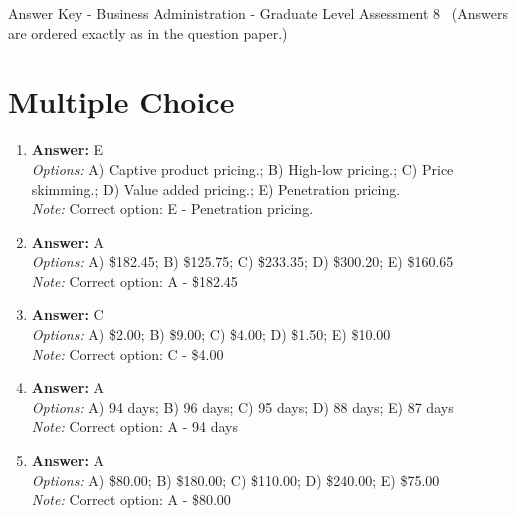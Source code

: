 \documentclass[12pt]{article}
\begin{document}
\begin{center}
Answer Key - Business Administration - Graduate Level Assessment 8 \
\small (Answers are ordered exactly as in the question paper.)
\end{center}

\section*{Multiple Choice}
\begin{enumerate}[label=\arabic*.]
\item \textbf{Answer:} E
\\ \textit{Options:} A) Captive product pricing.; B) High-low pricing.; C) Price skimming.; D) Value added pricing.; E) Penetration pricing.
\\ \textit{Note:} Correct option: E - Penetration pricing.
\item \textbf{Answer:} A
\\ \textit{Options:} A) \$182.45; B) \$125.75; C) \$233.35; D) \$300.20; E) \$160.65
\\ \textit{Note:} Correct option: A - \$182.45
\item \textbf{Answer:} C
\\ \textit{Options:} A) \$2.00; B) \$9.00; C) \$4.00; D) \$1.50; E) \$10.00
\\ \textit{Note:} Correct option: C - \$4.00
\item \textbf{Answer:} A
\\ \textit{Options:} A) 94 days; B) 96 days; C) 95 days; D) 88 days; E) 87 days
\\ \textit{Note:} Correct option: A - 94 days
\item \textbf{Answer:} A
\\ \textit{Options:} A) \$80.00; B) \$180.00; C) \$110.00; D) \$240.00; E) \$75.00
\\ \textit{Note:} Correct option: A - \$80.00
\end{enumerate}
\end{document}

